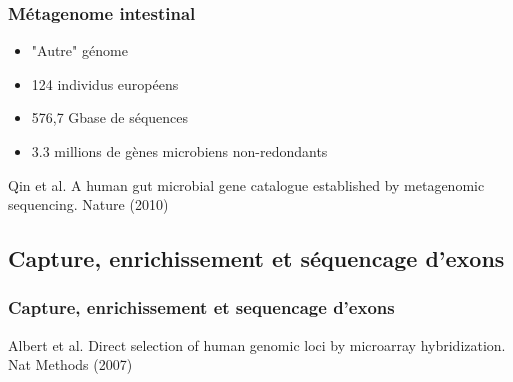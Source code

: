 \documentclass{beamer}
\begin{document}
\begin{frame}
	\frametitle{Métagenome intestinal}
\begin{itemize}
	\item "Autre" génome
	\item 124 individus européens
	\item 576,7 Gbase de séquences
	\item  3.3 millions de gènes microbiens non-redondants
\end{itemize}
\tiny{Qin et al. A human gut microbial gene catalogue established by metagenomic sequencing. Nature (2010)}
\end{frame}



\subsection{Capture, enrichissement et séquencage d'exons} %
\label{sub:subsection_name}



\begin{frame}
	\frametitle{Capture, enrichissement et sequencage d'exons}
		\tiny{Albert et al. Direct selection of human genomic loci by microarray hybridization. Nat Methods (2007)}
\end{frame}
\end{document}
